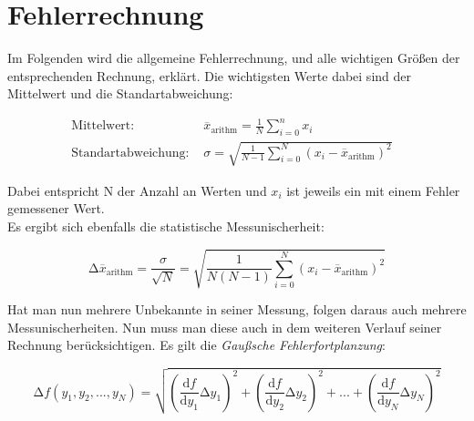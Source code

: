 \section{Fehlerrechnung}
\label{sec:Fehlerrechnung}


Im Folgenden wird die allgemeine Fehlerrechnung, und alle wichtigen Größen der entsprechenden Rechnung, erklärt.
Die wichtigsten Werte dabei sind der Mittelwert und die Standartabweichung:

\begin{align}
    \text{Mittelwert:} & \stackrel{_{-}}{x}_{\text{arithm}}  = \frac{1}{N} \sum_{i=0}^{n} x_i & \\
    \text{Standartabweichung: } & \sigma  = \sqrt{\frac{1}{N - 1 } \sum_{i=0}^{N} (x_i -  \stackrel{_{-}}{x}_{\text{arithm}})^2}
\end{align}

Dabei entspricht N der Anzahl an Werten und $x_i$ ist jeweils ein mit einem Fehler gemessener Wert.\\
Es ergibt sich ebenfalls die statistische Messunischerheit:

\begin{equation}
    \increment \stackrel{_{-}}{x}_{\text{arithm}} = \frac{\sigma}{\sqrt{N}} = 
    \sqrt{\frac{1}{N(N - 1)} \sum_{i=0}^{N} (x_i -  \stackrel{_{-}}{x}_{\text{arithm}})^2}
\end{equation}

Hat man nun mehrere Unbekannte in seiner Messung, folgen daraus auch mehrere Messunischerheiten.
Nun muss man diese auch in dem weiteren Verlauf seiner Rechnung berücksichtigen.
Es gilt die \textit{Gaußsche Fehlerfortplanzung}:

\begin{equation}
    \increment f(y_1 ,y_2 ,...,y_N ) = \sqrt{\left(\frac{\text{d} f}{\text{d} y_{1}} \increment y_{1}\right)^2
    + \left(\frac{\text{d} f}{\text{d} y_{2}} \increment y_{2}\right)^2 + ... + 
    \left(\frac{\text{d} f}{\text{d} y_{N}} \increment y_{N}\right)^2
    }
\end{equation}